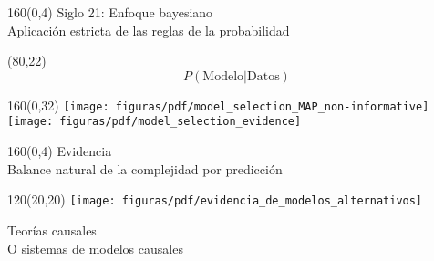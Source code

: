 \documentclass[shownotes,aspectratio=169]{beamer}
\begin{document}
\begin{frame}[plain]
\begin{textblock}{160}(0,4)
\centering  \LARGE Siglo 21: Enfoque bayesiano \\
\large Aplicación estricta de las reglas de la probabilidad
\end{textblock}

\begin{textblock}{80}(80,22)\Large
\begin{equation*}
P(\text{Modelo}|\text{Datos})
\end{equation*}
\end{textblock}


\begin{textblock}{160}(0,32)
     \centering
       \texttt{[image: figuras/pdf/model\_selection\_MAP\_non-informative]}
       \texttt{[image: figuras/pdf/model\_selection\_evidence]}
\end{textblock}

\end{frame}



\begin{frame}[plain]
\begin{textblock}{160}(0,4)
\centering \LARGE  Evidencia \\
\large Balance natural de la complejidad por predicci\'on
\end{textblock}


 \begin{textblock}{120}(20,20)
  \centering
  \texttt{[image: figuras/pdf/evidencia\_de\_modelos\_alternativos]}
 \end{textblock}

\end{frame}





\begin{frame}

\centering
\Huge Teorías causales \\

\Large O sistemas de modelos causales

\end{frame}
\end{document}
